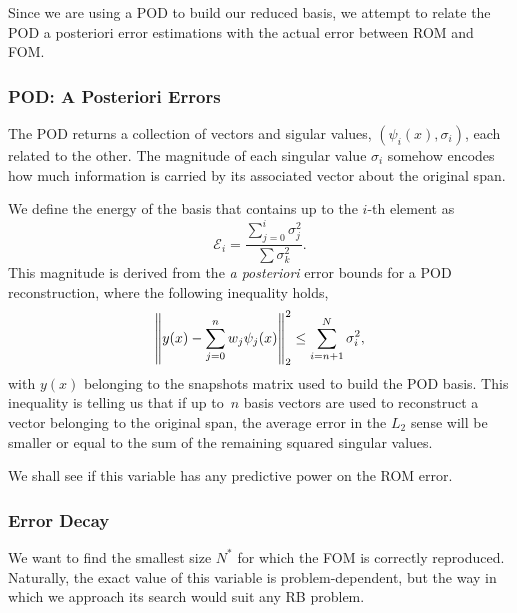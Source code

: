 \documentclass[../../thesis.tex]{subfiles}
\begin{document}
Since we are using a POD to build our reduced basis, 
we attempt to relate the POD a posteriori error estimations with 
the actual error between ROM and FOM.

\subsubsection{POD: A Posteriori Errors}
The POD returns a collection of vectors and sigular values, 
$(\psi_i(x), \sigma_i)$,
each related to the other.
The magnitude of each singular value $\sigma_i$ somehow encodes 
how much information is carried by its associated vector about the original span.

We define the energy of the basis that contains up to the $i$-th element as
\begin{equation}
    \mathcal{E}_i = \frac{\sum_{j=0}^{i}\sigma_j^2}{\sum \sigma_k^2}.
\end{equation}
This magnitude is derived from the \textit{a posteriori} error bounds 
for a POD reconstruction, where the following inequality holds,
\begin{equation}
    \norm{y(x) - \sum_{j=0}^{n} w_j \psi_j(x)}_{2}^{2} \leq \sum_{i = n+1}^{N} \sigma_i^2,
\end{equation}
with $y(x)$ belonging to the snapshots matrix used to build the POD basis.
This inequality is telling us that if up to~$n$ basis vectors are used
to reconstruct a vector belonging to the original span,
the average error in the $L_2$ sense will be smaller or equal
to the sum of the remaining squared singular values.

We shall see if this variable has any predictive power on the ROM error.

\subsubsection{Error Decay}
We want to find the smallest size $N^{*}$ for which the FOM is correctly reproduced.
Naturally, the exact value of this variable is problem-dependent, 
but the way in which we approach its search would suit any RB problem.
\end{document}
